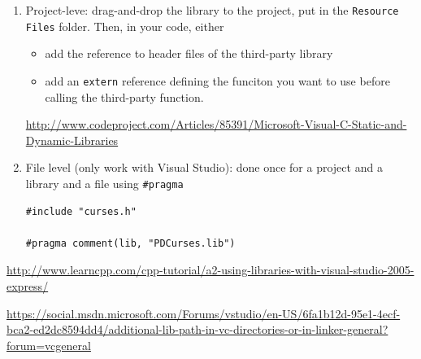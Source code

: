 \begin{enumerate}
\begin{verbatim}
Configuration Properties
    Linker
       Input
       
Use "Additional Dependencies"
  add the name of the .LIB library
  
         
\end{verbatim}  

We don't need to specify the library search path if we put the relative path as well as the library filename in the 
\verb!Additional Dependencies! section above.
\begin{verbatim}
.\Lib\mystatic.lib
\end{verbatim}
rather than just 
\begin{verbatim}
mystatic.lib
\end{verbatim}
  
  
   \item Project-leve: drag-and-drop the library to
   the project, put in the \verb!Resource Files! folder. Then, in your code, either   
\begin{itemize}
  \item add the reference to header files of the third-party library
  \item add an \verb!extern! reference defining the funciton you want to use before calling the third-party function. 
\end{itemize}
\url{http://www.codeproject.com/Articles/85391/Microsoft-Visual-C-Static-and-Dynamic-Libraries}

  
  \item File level (only work with Visual Studio): done once for a project and a library and a file using \verb!#pragma!
  
\begin{verbatim}
#include "curses.h"

#pragma comment(lib, "PDCurses.lib")
\end{verbatim}
   
\end{enumerate}
\url{http://www.learncpp.com/cpp-tutorial/a2-using-libraries-with-visual-studio-2005-express/}

%   
%   
\url{https://social.msdn.microsoft.com/Forums/vstudio/en-US/6fa1b12d-95e1-4ecf-bca2-ed2dc8594dd4/additional-lib-path-in-vc-directories-or-in-linker-general?forum=vcgeneral}

